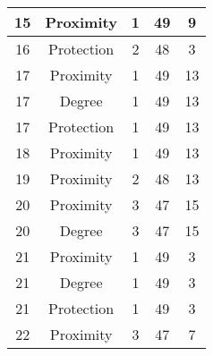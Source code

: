 \documentclass[results.tex]{subfiles}
\begin{document}
\begin{center}
\begin{tabular}{| c || c | c | c | c |}
            \hline
            15                      & Proximity                    & 1                      & 49                      & 9                    \\
            \hline
            16                      & Protection                   & 2                      & 48                      & 3                    \\
            \hline
            17                      & Proximity                    & 1                      & 49                      & 13                   \\
            \hline
            17                      & Degree                       & 1                      & 49                      & 13                   \\
            \hline
            17                      & Protection                   & 1                      & 49                      & 13                   \\
            \hline
            18                      & Proximity                    & 1                      & 49                      & 13                   \\
            \hline
            19                      & Proximity                    & 2                      & 48                      & 13                   \\
            \hline
            20                      & Proximity                    & 3                      & 47                      & 15                   \\
            \hline
            20                      & Degree                       & 3                      & 47                      & 15                   \\
            \hline
            21                      & Proximity                    & 1                      & 49                      & 3                    \\
            \hline
            21                      & Degree                       & 1                      & 49                      & 3                    \\
            \hline
            21                      & Protection                   & 1                      & 49                      & 3                    \\
            \hline
            22                      & Proximity                    & 3                      & 47                      & 7                    \\

\end{tabular}
\end{center}
\end{document}
